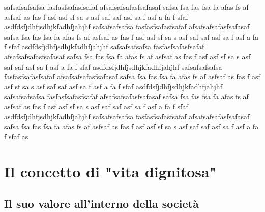 safsafsafsafsa
fasfasfsafasfsafaf
afsafsafsafasfsafasaf safsa fsa fas fsa fa afas fs af asfsaf as fas f asf asf sf sa s asf saf saf asf sa f asf a fa f sfaf asdfdsfjdhfjsdhjkfadhfjahjhf
safsafsafsafsa
fasfasfsafasfsafaf
afsafsafsafasfsafasaf safsa fsa fas fsa fa afas fs af asfsaf as fas f asf asf sf sa s asf saf saf asf sa f asf a fa f sfaf asdfdsfjdhfjsdhjkfadhfjahjhf
safsafsafsafsa
fasfasfsafasfsafaf
afsafsafsafasfsafasaf safsa fsa fas fsa fa afas fs af asfsaf as fas f asf asf sf sa s asf saf saf asf sa f asf a fa f sfaf asdfdsfjdhfjsdhjkfadhfjahjhf
safsafsafsafsa
fasfasfsafasfsafaf
afsafsafsafasfsafasaf safsa fsa fas fsa fa afas fs af asfsaf as fas f asf asf sf sa s asf saf saf asf sa f asf a fa f sfaf asdfdsfjdhfjsdhjkfadhfjahjhf
safsafsafsafsa
fasfasfsafasfsafaf
afsafsafsafasfsafasaf safsa fsa fas fsa fa afas fs af asfsaf as fas f asf asf sf sa s asf saf saf asf sa f asf a fa f sfaf asdfdsfjdhfjsdhjkfadhfjahjhf
safsafsafsafsa
fasfasfsafasfsafaf
afsafsafsafasfsafasaf safsa fsa fas fsa fa afas fs af asfsaf as fas f asf asf sf sa s asf saf saf asf sa f asf a fa f sfaf as
\section{Il concetto di "vita dignitosa"}
\subsection{Il suo valore all'interno della società}